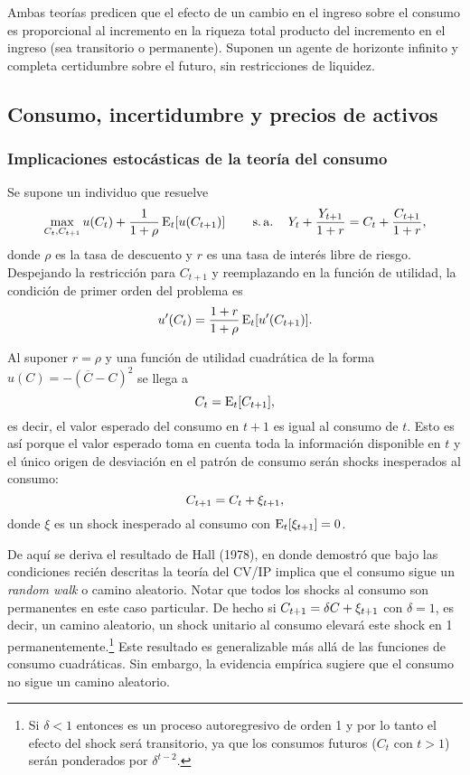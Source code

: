 \documentclass[DeGregorioResumen]{subfiles}
\begin{document}
Ambas teorías predicen que el efecto de un cambio en el ingreso sobre el consumo es proporcional al incremento en la riqueza total producto del incremento en el ingreso (sea transitorio o permanente). Suponen un agente de horizonte infinito y completa certidumbre sobre el futuro, sin restricciones de liquidez.

\subsection{Consumo, incertidumbre y precios de activos}

\subsubsection{Implicaciones estocásticas de la teoría del consumo}

Se supone un individuo que resuelve
\begin{equation*}
\max_{C_t,C_{t+1}} u(C_t)+\frac{1}{1+\rho}\operatorname{E}_{t}[u(C_{t+1})] \operatorname{\qquad s.a.\quad} Y_t+\frac{Y_{t+1}}{1+r}=C_t+\frac{C_{t+1}}{1+r},
\end{equation*}
donde $\rho $ es la tasa de descuento y $r$ es una tasa de interés libre de riesgo. Despejando la restricción para $C_{t+1}$ y reemplazando en la función de utilidad, la condición de primer orden del problema es
\begin{equation*}
u'(C_t)= \frac{1+r}{1+\rho} \operatorname{E}_{t}[u'(C_{t+1})].
\end{equation*}

Al suponer $r=\rho$ y una función de utilidad cuadrática de la forma $u(C)=-(\overline{C}-C)^2$ se llega a
\begin{equation*}
C_t=\operatorname{E}_t[C_{t+1}],
\end{equation*}
es decir, el valor esperado del consumo en $t+1 $ es igual al consumo de $t $. Esto es así porque el valor esperado toma en cuenta toda la información disponible en $t$ y el único origen de desviación en el patrón de consumo serán shocks inesperados al consumo:
\begin{equation}
{C}_{t+1}={C}_{t}+{\xi}_{t+1},
\end{equation}
donde $\xi$ es un shock inesperado al consumo con $\operatorname{E}_{t}[{\xi}_{t+1}]=0$.

De aquí se deriva el resultado de Hall (1978), en donde demostró que bajo las condiciones recién descritas la teoría del CV/IP implica que el consumo sigue un \textit{random walk} o camino aleatorio. Notar que todos los shocks al consumo son permanentes en este caso particular. De hecho si ${C}_{t+1}=\delta C+\xi_{t+1}$ con  $\delta=1$, es decir, un camino aleatorio, un shock unitario al consumo elevará este shock en 1 permanentemente.\footnote{Si $\delta<1$ entonces es un proceso autoregresivo de orden 1 y por lo tanto el efecto del shock será transitorio, ya que los consumos futuros ($C_t$ con $t>1$) serán ponderados por $\delta^{t-2}$.} Este resultado es generalizable más allá de las funciones de consumo cuadráticas. Sin embargo, la evidencia empírica sugiere que el consumo no sigue un camino aleatorio.
\end{document}
